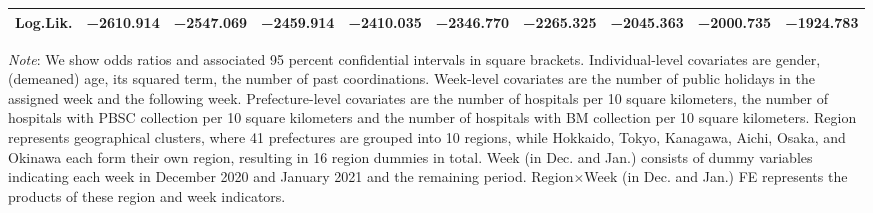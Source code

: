 \documentclass[12pt, a4paper]{article}
\begin{document}
\begin{landscape}
\begin{table}[H]
\begin{threeparttable}
\begin{tabular}[t]{lccccccccc}
Log.Lik. & \num{-2610.914} & \num{-2547.069} & \num{-2459.914} & \num{-2410.035} & \num{-2346.770} & \num{-2265.325} & \num{-2045.363} & \num{-2000.735} & \num{-1924.783}\\
\bottomrule
\end{tabular}
\begin{tablenotes}
\item \emph{Note}: We show odds ratios and associated 95 percent confidential intervals in square brackets. Individual-level covariates are gender, (demeaned) age, its squared term, the number of past coordinations. Week-level covariates are the number of public holidays in the assigned week and the following week. Prefecture-level covariates are the number of hospitals per 10 square kilometers, the number of hospitals with PBSC collection per 10 square kilometers and the number of hospitals with BM collection per 10 square kilometers. Region represents geographical clusters, where 41 prefectures are grouped into 10 regions, while Hokkaido, Tokyo, Kanagawa, Aichi, Osaka, and Okinawa each form their own region, resulting in 16 region dummies in total. Week (in Dec. and Jan.) consists of dummy variables indicating each week in December 2020 and January 2021 and the remaining period. Region$\times$Week (in Dec. and Jan.) FE represents the products of these region and week indicators.
\end{tablenotes}
\end{threeparttable}
\end{table}
\end{landscape}
\end{document}

